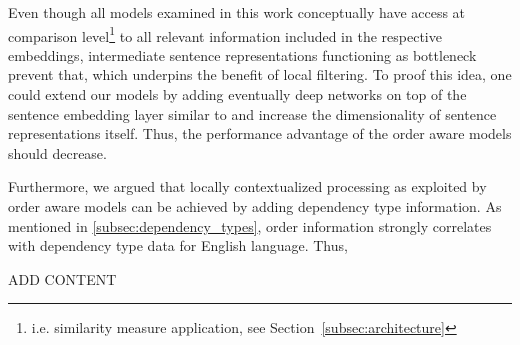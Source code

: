 
Even though all models examined in this work conceptually have access at comparison level\footnote{i.e. similarity measure application, see Section~\ref{subsec:architecture}} to all relevant information included in the respective embeddings, intermediate sentence representations functioning as bottleneck prevent that, which underpins the benefit of local filtering. To proof this idea, one could extend our models by adding eventually deep networks on top of the sentence embedding layer similar to \textcite{iyyer_deep_2015} and increase the dimensionality of sentence representations itself. Thus, the performance advantage of the order aware models should decrease.

Furthermore, we argued that locally contextualized processing as exploited by order aware models can be achieved by adding dependency type information. As mentioned in \ref{subsec:dependency_types}, order information strongly correlates with dependency type data for English language. Thus, 


ADD CONTENT








